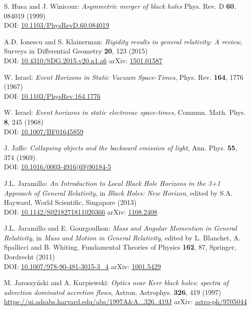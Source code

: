 \begin{thebibliography}{123}
S. Husa and J. Winicour:
{\em Asymmetric merger of black holes}
Phys. Rev. D {\bf 60}, 084019 (1999)\\
DOI: \href{https://doi.org/10.1103/PhysRevD.60.084019}{10.1103/PhysRevD.60.084019}

A.D. Ionescu and S. Klainerman:
{\em Rigidity results in general relativity: A review},
Surveys in Differential Geometry {\bf 20}, 123 (2015)\\
DOI: \href{https://dx.doi.org/10.4310/SDG.2015.v20.n1.a6}{10.4310/SDG.2015.v20.n1.a6}\hfill
arXiv: \href{https://arxiv.org/abs/1501.01587}{1501.01587}

W. Israel: {\em Event Horizons in Static Vacuum Space-Times},
Phys. Rev. {\bf 164}, 1776 (1967)\\
DOI: \href{https://doi.org/10.1103/PhysRev.164.1776}{10.1103/PhysRev.164.1776}

W. Israel: {\em Event horizons in static electrovac space-times},
Commun. Math. Phys. {\bf 8}, 245 (1968)\\
DOI: \href{https://doi.org/10.1007/BF01645859}{10.1007/BF01645859}

J. Jaffe:
{\em Collapsing objects and the backward emission of light},
Ann. Phys. {\bf 55}, 374 (1969)\\
DOI: \href{https://doi.org/10.1016/0003-4916(69)90184-5}{10.1016/0003-4916(69)90184-5}

J.L. Jaramillo: {\em An Introduction to Local Black Hole Horizons in the 3+1
Approach of General Relativity}, in {\em Black Holes: New Horizon}, edited
by S.A. Hayward, World Scientific, Singapore (2013)\\
DOI: \href{https://doi.org/10.1142/S0218271811020366}{10.1142/S0218271811020366}\hfill
arXiv: \href{https://arxiv.org/abs/1108.2408}{1108.2408}

J.L. Jaramillo and E. Gourgoulhon:
{\em Mass and Angular Momentum in General Relativity},
in \emph{Mass and Motion in General Relativity}, edited by L. Blanchet, A. Spallicci and B. Whiting, Fundamental Theories of Physics {\bf 162}, 87,
Springer, Dordrecht (2011) \\
DOI: \href{https://doi.org/10.1007/978-90-481-3015-3_4}{10.1007/978-90-481-3015-3\_4}\hfill
arXiv: \href{https://arxiv.org/abs/1001.5429}{1001.5429}

M. Jaroszy\'nski and A. Kurpiewski:
{\em Optics near Kerr black holes: spectra of advection dominated accretion flows},
Astron. Astrophys. {\bf 326}, 419 (1997)\\
\url{https://ui.adsabs.harvard.edu/abs/1997A&A...326..419J}\hfill
arXiv: \href{https://arxiv.org/abs/astro-ph/9705044}{astro-ph/9705044}


\end{thebibliography}
